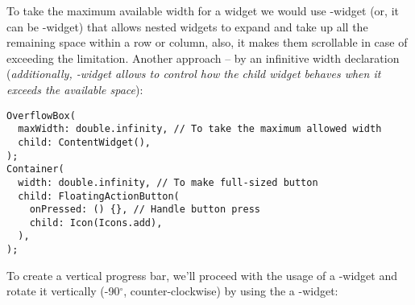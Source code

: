 \noindent To take the maximum available width for a widget we would use -widget (or, it can be 
-widget) that allows nested widgets to expand and take up all the remaining space within a row or column, 
also, it makes them scrollable in case of exceeding the limitation. Another approach -- by an infinitive width 
declaration (\emph{additionally, -widget allows to control how the child widget behaves when it 
exceeds the available space}):

\begin{lstlisting}
OverflowBox(
  maxWidth: double.infinity, // To take the maximum allowed width
  child: ContentWidget(),
);
Container(
  width: double.infinity, // To make full-sized button
  child: FloatingActionButton(
    onPressed: () {}, // Handle button press
    child: Icon(Icons.add),
  ),
);
\end{lstlisting}

\noindent To create a vertical progress bar, we'll proceed with the usage of a -widget and 
rotate it vertically (-90$^{\circ}$, counter-clockwise) by using the a -widget:

